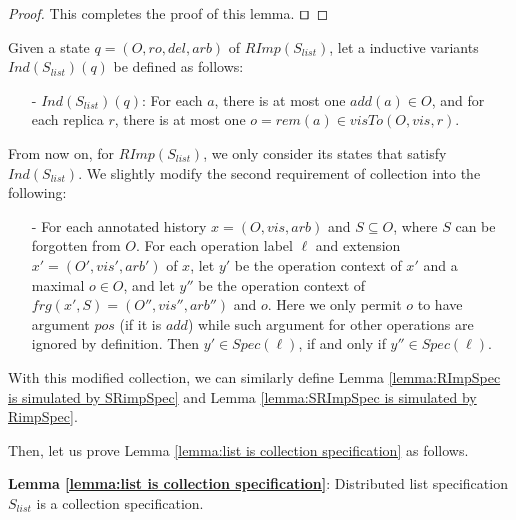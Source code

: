 \begin {proof}
This completes the proof of this lemma. $\qed$
\end {proof}

Given a state $q = (O,\mathit{ro},\mathit{del},\mathit{arb})$ of $\mathit{RImp}( S_{\mathit{list}} )$, let a inductive variants $\mathit{Ind}(S_{\mathit{list}})(q)$ be defined as follows:

\begin{itemize}
\setlength{\itemsep}{0.5pt}
\item[-] $\mathit{Ind}(S_{\mathit{list}})(q)$: For each $a$, there is at most one $\mathit{add}(a) \in O$, and for each replica $r$, there is at most one $o = \mathit{rem}(a) \in \mathit{visTo}(O,\mathit{vis},r)$.
\end{itemize}

From now on, for $\mathit{RImp}( S_{\mathit{list}} )$, we only consider its states that satisfy $\mathit{Ind}(S_{\mathit{list}})$. We slightly modify the second requirement of collection into the following:

\begin{itemize}
\setlength{\itemsep}{0.5pt}
\item[-] For each annotated history $x = (O,\mathit{vis},\mathit{arb})$ and $S \subseteq O$, where $S$ can be forgotten from $O$. For each operation label $\ell$ and extension $x' = (O',\mathit{vis}',\mathit{arb}')$ of $x$, let $y'$ be the operation context of $x'$ and a maximal $o \in O$, and let $y''$ be the operation context of $frg(x',S) = (O'',\mathit{vis}'',\mathit{arb}'')$ and $o$. Here we only permit $o$ to have argument $\mathit{pos}$ (if it is $\mathit{add}$) while such argument for other operations are ignored by definition. Then $y' \in Spec(\ell)$, if and only if $y'' \in Spec(\ell)$.
\end{itemize}

With this modified collection, we can similarly define Lemma \ref{lemma:RImpSpec is simulated by SRimpSpec} and Lemma \ref{lemma:SRImpSpec is simulated by RimpSpec}.

Then, let us prove Lemma \ref{lemma:list is collection specification} as follows.

{\noindent \bf Lemma \ref{lemma:list is collection specification}}: Distributed list specification $S_{\mathit{list}}$ is a collection specification.

